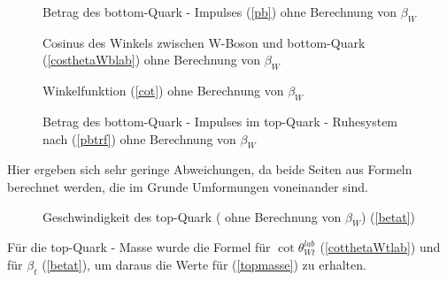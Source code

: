 \documentclass[
a4paper,                                %
twoside,                                %
BCOR1.4cm,                      %
ngerman,                                %
10pt,                           %
headings=normal,                %
headsepline,                    %
clearplainpage, %
final,                                  %
div=14,
parskip=full
]{scrbook}
\begin{document}
\begin{figure}[h]
    \caption{Betrag des bottom-Quark - Impulses (\ref{pb}) ohne Berechnung von $ \beta_{W} $}
\end{figure}

\newpage

\begin{figure}[h]
    \caption{Cosinus des Winkels zwischen W-Boson und bottom-Quark (\ref{costhetaWblab}) ohne Berechnung von $ \beta_{W} $}
\end{figure}

\begin{figure}[h]
    \caption{Winkelfunktion (\ref{cot}) ohne Berechnung von $ \beta_{W} $}
\end{figure}

\newpage

\begin{figure}[h]
    \caption{Betrag des bottom-Quark - Impulses im top-Quark - Ruhesystem nach (\ref{pbtrf}) ohne Berechnung von $ \beta_{W} $}
\end{figure}

Hier ergeben sich sehr geringe Abweichungen, da beide Seiten aus Formeln berechnet werden, die im Grunde Umformungen voneinander sind.

\begin{figure}[h]
    \caption{Geschwindigkeit des top-Quark ( ohne Berechnung von $ \beta_{W} $) (\ref{betat})}
\end{figure}

\newpage

F\"ur die top-Quark - Masse wurde die Formel f\"ur $ \cot \theta_{Wt}^{lab} $ (\ref{cotthetaWtlab}) und f\"ur $ \beta_{t} $ (\ref{betat}), um daraus die Werte f\"ur (\ref{topmasse}) zu erhalten.
\end{document}
